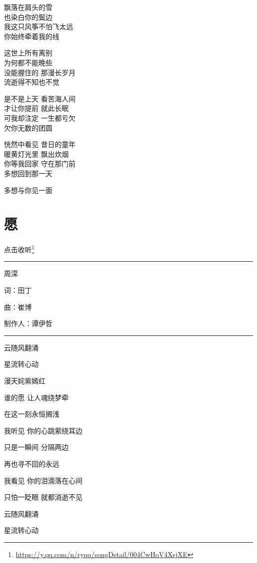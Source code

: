 \documentclass[]{ctexbook}
\renewcommand{\href}[2]{#2\footnote{\url{#1}}}
\begin{document}
飘落在肩头的雪\\
也染白你的鬓边\\
我这只风筝不怕飞太远\\
你始终牵着我的线

这世上所有离别\\
为何都不能晚些\\
没能握住的 那漫长岁月\\
流逝得不知也不觉

是不是上天 看苦海人间\\
才让你提前 就此长眠\\
可我却注定 一生都亏欠\\
欠你无数的团圆

恍然中看见 昔日的童年\\
暖黄灯光里 飘出炊烟\\
你等我回家 守在那门前\\
多想回到那一天

多想与你见一面

\section*{愿}\label{wish}


\href{https://y.qq.com/n/ryqq/songDetail/004CwHoV4XsjXE}{点击收听}

\begin{center}\rule{0.5\linewidth}{0.5pt}\end{center}

周深

词：田丁

曲：崔博

制作人：谭伊哲

\begin{center}\rule{0.5\linewidth}{0.5pt}\end{center}

云随风翻涌

星流转心动

漫天姹紫嫣红

谁的愿 让人魂绕梦牵

在这一刻永恒搁浅

我听见 你的心跳萦绕耳边

只是一瞬间 分隔两边

再也寻不回的永远

我看见 你的泪滴落在心间

只怕一眨眼 就都消逝不见

云随风翻涌

星流转心动
\end{document}
